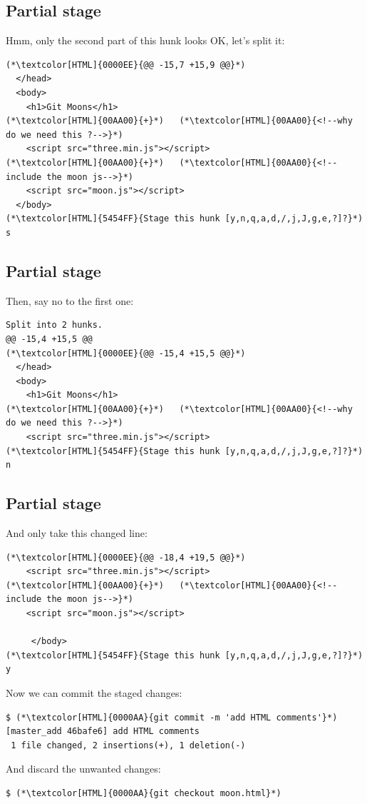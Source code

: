 \subsection{Partial stage}
\begin{frame}[fragile]
  \subslidetitle

  Hmm, only the second part of this hunk looks OK, let's split it:
  \begin{lstlisting}
(*\textcolor[HTML]{0000EE}{@@ -15,7 +15,9 @@}*)
  </head>
  <body>
    <h1>Git Moons</h1>
(*\textcolor[HTML]{00AA00}{+}*)   (*\textcolor[HTML]{00AA00}{<!--why do we need this ?-->}*)
    <script src="three.min.js"></script>
(*\textcolor[HTML]{00AA00}{+}*)   (*\textcolor[HTML]{00AA00}{<!--include the moon js-->}*)
    <script src="moon.js"></script>
  </body>
(*\textcolor[HTML]{5454FF}{Stage this hunk [y,n,q,a,d,/,j,J,g,e,?]?}*) s
\end{lstlisting}
\end{frame}

\subsection{Partial stage}
\begin{frame}[fragile]
  \subslidetitle

  Then, say no to the first one:
  \begin{lstlisting}
Split into 2 hunks.
@@ -15,4 +15,5 @@
(*\textcolor[HTML]{0000EE}{@@ -15,4 +15,5 @@}*)
  </head>
  <body>
    <h1>Git Moons</h1>
(*\textcolor[HTML]{00AA00}{+}*)   (*\textcolor[HTML]{00AA00}{<!--why do we need this ?-->}*)
    <script src="three.min.js"></script>
(*\textcolor[HTML]{5454FF}{Stage this hunk [y,n,q,a,d,/,j,J,g,e,?]?}*) n
\end{lstlisting}
\end{frame}

\subsection{Partial stage}
\begin{frame}[fragile]
  \subslidetitle
  And only take this changed line:
  \begin{lstlisting}
(*\textcolor[HTML]{0000EE}{@@ -18,4 +19,5 @@}*)
    <script src="three.min.js"></script>
(*\textcolor[HTML]{00AA00}{+}*)   (*\textcolor[HTML]{00AA00}{<!--include the moon js-->}*)
    <script src="moon.js"></script>

     </body>
(*\textcolor[HTML]{5454FF}{Stage this hunk [y,n,q,a,d,/,j,J,g,e,?]?}*) y
\end{lstlisting}

  Now we can commit the staged changes:
  \begin{lstlisting}
$ (*\textcolor[HTML]{0000AA}{git commit -m 'add HTML comments'}*)
[master_add 46bafe6] add HTML comments
 1 file changed, 2 insertions(+), 1 deletion(-)
\end{lstlisting}

  And discard the unwanted changes:
  \begin{lstlisting}
$ (*\textcolor[HTML]{0000AA}{git checkout moon.html}*)
\end{lstlisting}
\end{frame}

